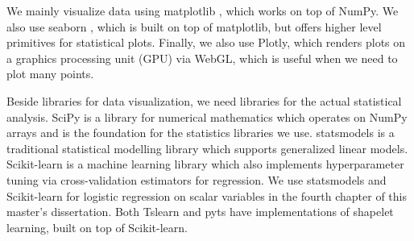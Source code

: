 We mainly visualize data using matplotlib \citep{DBLP:journals/cse/Hunter07}, which works on top of NumPy.
We also use seaborn \citep{DBLP:journals/jossw/Waskom21}, which is built on top of matplotlib, but offers higher level primitives for statistical plots.
Finally, we also use Plotly, which renders plots on a graphics processing unit (GPU) via WebGL, which is useful when we need to plot many points.

Beside libraries for data visualization, we need libraries for the actual statistical analysis.
SciPy \citep{DBLP:journals/corr/abs-1907-10121} is a library for numerical mathematics which operates on NumPy arrays and is the foundation for the statistics libraries we use.
statsmodels \citep{statsmodels} is a traditional statistical modelling library which supports generalized linear models.
Scikit-learn \citep{DBLP:journals/jmlr/PedregosaVGMTGBPWDVPCBPD11} is a machine learning library which also implements hyperparameter tuning via cross-validation estimators for regression.
We use statsmodels and Scikit-learn for logistic regression on scalar variables in the fourth chapter of this master's dissertation.
Both Tslearn \citep{DBLP:journals/jmlr/TavenardFVDAHPY20} and pyts \citep{DBLP:journals/jmlr/FaouziJ20} have implementations of shapelet learning, built on top of Scikit-learn.
